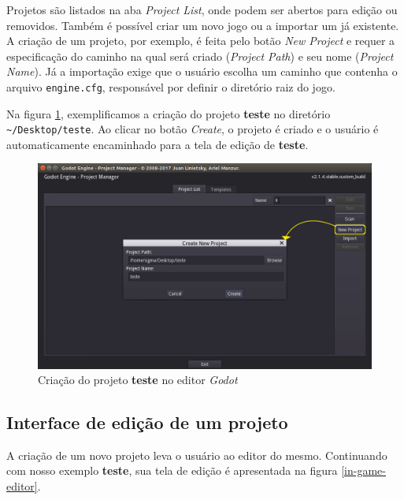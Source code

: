 Projetos são listados na aba \textit{Project List}, onde podem ser abertos para edição ou removidos. Também é possível criar um novo jogo ou a importar um já existente. A criação de um projeto, por exemplo, é feita pelo botão \textit{New Project} e requer a especificação do caminho na qual será criado (\textit{Project Path}) e seu nome (\textit{Project Name}). Já a importação exige que o usuário escolha um caminho que contenha o arquivo \texttt{engine.cfg}, responsável por definir o diretório raiz do jogo.

Na figura \ref{editor-project-create}, exemplificamos a criação do projeto \textbf{teste} no diretório \texttt{\textasciitilde/Desktop/teste}. Ao clicar no botão \textit{Create}, o projeto é criado e o usuário é automaticamente encaminhado para a tela de edição de \textbf{teste}.

\begin{figure}[H]
  \centering
  \includegraphics[width=.85\textwidth]{image/editor-project-create-edit}
  \caption{Criação do projeto \textbf{teste} no editor \textit{Godot}}
  \label{editor-project-create}
\end{figure}


\subsection{Interface de edição de um projeto}

A criação de um novo projeto leva o usuário ao editor do mesmo. Continuando com nosso exemplo \textbf{teste}, sua tela de edição é apresentada na figura \ref{in-game-editor}.

